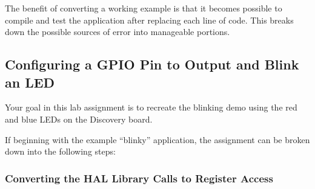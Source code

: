 \documentclass[openany,11pt,fleqn]{book} %
\begin{document}
The benefit of converting a working example is that it becomes possible to compile and test the application after replacing each line of code. This breaks down the possible sources of error into manageable portions. 

\subsection{Configuring a GPIO Pin to Output and Blink an LED}

Your goal in this lab assignment is to recreate the blinking demo using the red and blue LEDs on the Discovery board. 

If beginning with the example ``blinky'' application, the assignment can be broken down into the following steps:

\subsubsection{Converting the HAL Library Calls to Register Access}
\end{document}
